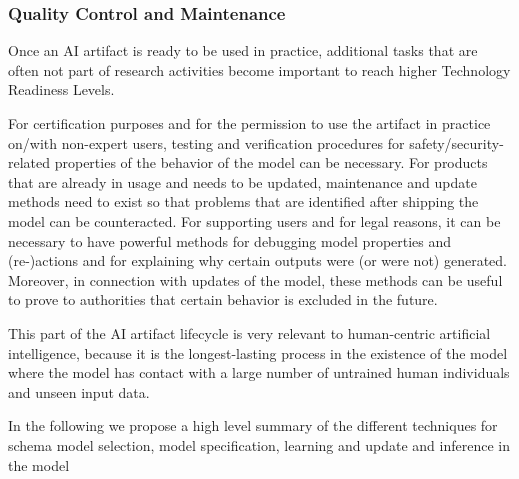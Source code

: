 \subsubsection{Quality Control and  Maintenance}
Once an AI artifact is ready to be used in practice,
additional tasks that are often not part of research activities become important
to reach higher Technology Readiness Levels.

For certification purposes and for the permission to use the artifact in practice on/with non-expert users, testing and verification procedures for safety/security-related properties of the behavior of the model can be necessary.
%
For products that are already in usage and needs to be updated,
maintenance and update methods need to exist so that problems that are identified after shipping the model can be counteracted.
%
For supporting users and for legal reasons, it can be necessary to have powerful methods for debugging model properties and (re-)actions and for explaining why certain outputs were (or were not) generated. Moreover, in connection with updates of the model, these methods can be useful to prove to authorities that certain behavior is excluded in the future.

This part of the AI artifact lifecycle is very relevant to human-centric artificial intelligence, because it is the longest-lasting process in the existence of the model where the model has contact with a large number of untrained human individuals and unseen input data.


In the following we propose a high level summary of the different
techniques for schema model selection, model specification, learning
and update and inference in the model

